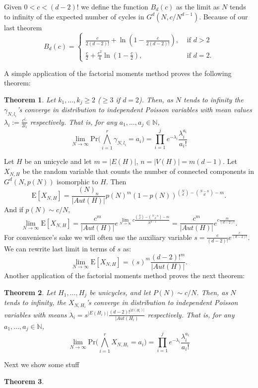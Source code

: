 \documentclass[11pt,notitlepage,a4paper]{article}
\newtheorem{theorem}{Theorem}[section]
\theoremstyle{definition}
\newcommand{\N}{\mathbb{N}}
\newcommand{\LN}{\lim\limits_{N\to \infty}}
\begin{document}
	Given $0<c<(d-2)!$ we define the function $B_d(c)$ as 
	the limit as $N$ tends to infinity of the expected number of
	cycles in $G^d(N,c/N^{d-1})$. Because of our last theorem
	\[
	B_d(c)=\begin{cases}
	\frac{c}{2(d-2)!}+ \ln\left(1-\frac{c}{2(d-2)!}\right)
	,& \text{ if } d>2\\	
	\frac{c}{2}+ \frac{c^2}{4} \ln\left(1-\frac{c}{2}\right)
	, &\text{ if } d=2.
	\end{cases}
	\]
	
	
	A simple application of the factorial moments method proves the following
	theorem:
	\begin{theorem}
		Let $k_1,\dots,k_j\geq 2$ ($\geq 3$ if $d=2$). Then, 
		as $N$ tends to infinity the $\gamma_{N,l_i}$'s converge 
		in distribution to independent Poisson variables
		with mean values $\lambda_i:=\frac{c^{l_i}}{2l_i}$ respectively.
		That is, for any $a_1,\dots,a_j\in \N$,
		\[
		\LN \mathrm{Pr}\Big(
		\bigwedge_{i=1}^r
		\gamma_{N,l_i}=a_i		
		\Big)= \prod_{i=1}^{j} e^{-\lambda_i}\frac{\lambda_i^{a_i}}{a_i!}
		\]
	\end{theorem}
	
	
	Let $H$ be an unicycle and let $m=|E(H)|$, $n=|V(H)|=m(d-1)$. 
	Let $X_{N,H}$ be the random variable that counts
	the number of connected components in $G^d(N,p(N))$ isomorphic to $H$. Then
	\[ 
	\mathrm{E}[X_{N,H}]= \frac{(N)_n}{|Aut(H)|}
	p(N)^{m}(1-p(N))^{\binom{N}{d}-\binom{N-n}{d} - m}.
	\]
	And if $p(N)\sim c/N$,
	\[
	\LN \mathrm{E}[X_{N,H}]=  \frac{c^m}{|Aut(H)|}
	e^{\LN c\frac{\binom{N}{d}-\binom{N-n}{d} - m}{N^{d-1}}}
	=  \frac{c^m}{|Aut(H)|}
	e^{c\frac{m}{(d-2)!}}.
	\]	
	For convenience's sake we will often use the auxiliary variable
	$s=\frac{c}{(d-2)!}e^{\frac{c}{(d-2)!}}$. We can rewrite last 
	limit in terms of $s$ as:
	\[
	\LN \mathrm{E}[X_{N,H}]=(s)^m
	\frac{(d-2)!^m}{|Aut(H)|}.	
	\]
	Another application of the factorial moments method proves the next theorem:

\begin{theorem}
	Let $H_1,\dots, H_j$ be unicycles, and let $P(N)\sim c/N$. 
	Then, as $N$ tends to infinity, the $X_{N,H_i}$'s converge in 
	distribution to independent Poisson variables with means
	$\lambda_i=s^{|E(H_i)|}\frac{(d-2)!^{|E(H_i)|}}{|Aut(H_i)}$
	respectively. That is, for any $a_1,\dots, a_j\in \N$,
	\[
	\LN \mathrm{Pr}\Big(
	\bigwedge_{i=1}^r
	X_{N,H_i}=a_i		
	\Big)= \prod_{i=1}^{j} e^{-\lambda_i}\frac{\lambda_i^{a_i}}{a_i!}
	\]
\end{theorem} 

Next we show some stuff




\begin{theorem}
	
\end{theorem} 




 






\end{document}

